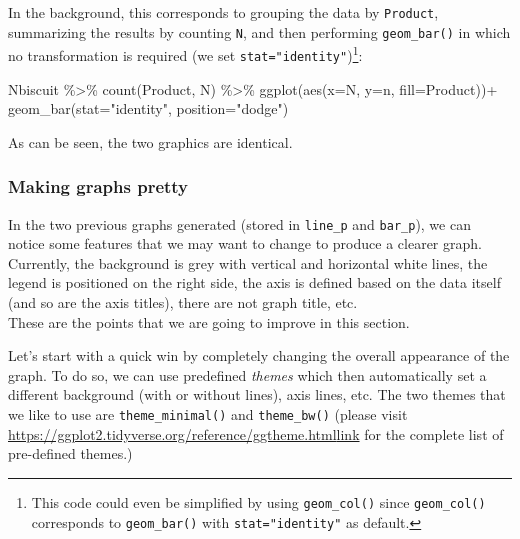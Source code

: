 \documentclass[
]{book}
\newenvironment{Shaded}{\begin{snugshade}}{\end{snugshade}}
\newcommand{\AttributeTok}[1]{\textcolor[rgb]{0.77,0.63,0.00}{#1}}
\newcommand{\FunctionTok}[1]{\textcolor[rgb]{0.00,0.00,0.00}{#1}}
\newcommand{\NormalTok}[1]{#1}
\newcommand{\SpecialCharTok}[1]{\textcolor[rgb]{0.00,0.00,0.00}{#1}}
\newcommand{\StringTok}[1]{\textcolor[rgb]{0.31,0.60,0.02}{#1}}
\begin{document}
In the background, this corresponds to grouping the data by \texttt{Product}, summarizing the results by counting \texttt{N}, and then performing \texttt{geom\_bar()} in which no transformation is required (we set \texttt{stat="identity"})\footnote{This code could even be simplified by using \texttt{geom\_col()} since \texttt{geom\_col()} corresponds to \texttt{geom\_bar()} with \texttt{stat="identity"} as default.}:

\begin{Shaded}
\begin{Highlighting}[]
\NormalTok{Nbiscuit }\SpecialCharTok{\%\textgreater{}\%} 
  \FunctionTok{count}\NormalTok{(Product, N) }\SpecialCharTok{\%\textgreater{}\%} 
  \FunctionTok{ggplot}\NormalTok{(}\FunctionTok{aes}\NormalTok{(}\AttributeTok{x=}\NormalTok{N, }\AttributeTok{y=}\NormalTok{n, }\AttributeTok{fill=}\NormalTok{Product))}\SpecialCharTok{+}
  \FunctionTok{geom\_bar}\NormalTok{(}\AttributeTok{stat=}\StringTok{"identity"}\NormalTok{, }\AttributeTok{position=}\StringTok{"dodge"}\NormalTok{)}
\end{Highlighting}
\end{Shaded}

As can be seen, the two graphics are identical.

\hypertarget{making-graphs-pretty}{%
\subsubsection{Making graphs pretty}\label{making-graphs-pretty}}

In the two previous graphs generated (stored in \texttt{line\_p} and \texttt{bar\_p}), we can notice some features that we may want to change to produce a clearer graph. Currently, the background is grey with vertical and horizontal white lines, the legend is positioned on the right side, the axis is defined based on the data itself (and so are the axis titles), there are not graph title, etc.\\
These are the points that we are going to improve in this section.

Let's start with a quick win by completely changing the overall appearance of the graph. To do so, we can use predefined \emph{themes} which then automatically set a different background (with or without lines), axis lines, etc. The two themes that we like to use are \texttt{theme\_minimal()} and \texttt{theme\_bw()} (please visit \url{https://ggplot2.tidyverse.org/reference/ggtheme.html}\href{https://ggplot2.tidyverse.org/reference/ggtheme.html}{link} for the complete list of pre-defined themes.)
\end{document}
